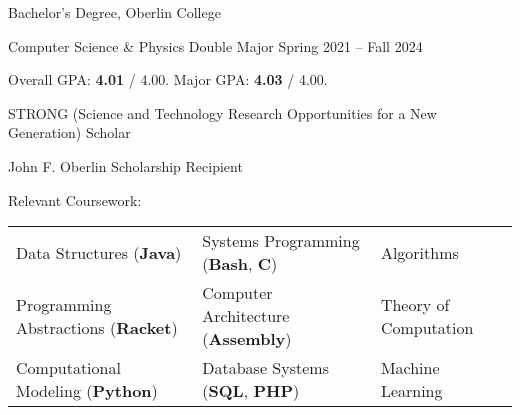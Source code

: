 \begin{entry}{Bachelor's Degree, Oberlin College}

	\entryItem
		{Computer Science \& Physics Double Major}
		{Spring 2021 -- Fall 2024}

	\begin{items}
		\item Overall GPA: \textbf{4.01} / 4.00. Major GPA: \textbf{4.03} / 4.00.
		
		\item STRONG (Science and Technology Research Opportunities for a New Generation) Scholar

		\item John F. Oberlin Scholarship Recipient
		
		\item Relevant Coursework:
		
			\hspace*{-0.25cm}
			\begin{tabular}{lll}
				Data Structures (\textbf{Java}) & Systems Programming (\textbf{Bash}, \textbf{C}) & Algorithms \\
				Programming Abstractions (\textbf{Racket}) & Computer Architecture (\textbf{Assembly}) & Theory of Computation \\
				Computational Modeling (\textbf{Python}) & Database Systems (\textbf{SQL}, \textbf{PHP}) & Machine Learning \\
			\end{tabular}
		\end{items}
		
\end{entry}
